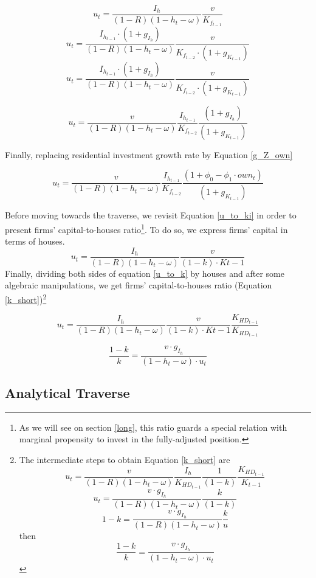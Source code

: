 \documentclass[11pt]{article}
\begin{document}
\begin{equation}
\label{u_to_k}
u_t = \frac{I_h}{(1-R)(1-h_t - \omega)}\frac{v}{K_{f_{t-1}}}
\end{equation}
$$
u_t = \frac{I_{h_{t-1}}\cdot (1 + g_{I_h})}{(1-R)(1-h_t - \omega)}\frac{v}{K_{f_{t-2}}\cdot (1+g_{K_{t-1}})}
$$
$$
u_t = \frac{I_{h_{t-1}}\cdot (1 + g_{I_h})}{(1-R)(1-h_t - \omega)}\frac{v}{K_{f_{t-2}}\cdot (1+g_{K_{t-1}})}
$$

\begin{equation}
\label{short_u}
u_t = \frac{v}{(1-R)(1-h_t - \omega)}\frac{I_{h_{t-1}}}{K_{f_{t-2}}}\frac{(1 + g_{I_h})}{(1+g_{K_{t-1}})}
\end{equation}


Finally, replacing residential investment growth rate by Equation \ref{g_Z_own}


\begin{equation}
\label{short_u}
u_t = \frac{v}{(1-R)(1-h_t - \omega)}\frac{I_{h_{t-1}}}{K_{f_{t-2}}}\frac{(1 + \phi_0 - \phi_1\cdot own_t)}{(1+g_{K_{t-1}})}
\end{equation}

Before moving towards the traverse, we revisit Equation \ref{u_to_ki} in order to present firms' capital-to-houses ratio\footnote{As we will see on section \ref{long}, this ratio guards a special relation with marginal propensity to invest in the fully-adjusted position.}.  To do so, we express firms' capital in terms of houses. 
$$
u_t = \frac{I_h}{(1-R)(1-h_t - \omega)}\frac{v}{(1-k)\cdot K{t-1}}
$$
Finally, dividing both sides of equation \ref{u_to_k} by houses and after some algebraic manipulations, we get firms' capital-to-houses ratio (Equation \ref{k_short})\footnote{The intermediate steps to obtain Equation \ref{k_short} are
$$
u_t = \frac{v}{(1-R)(1-h_t - \omega)}\frac{I_h}{K_{HD_{t-1}}}\frac{1}{(1-k)}\frac{K_{HD_{t-1}}}{K_{t-1}}
$$
$$
u_t = \frac{v\cdot g_{I_h}}{(1-R)(1-h_t - \omega)}\frac{k}{(1-k)}
$$
$$
1-k = \frac{v\cdot g_{I_h}}{(1-R)(1-h_t - \omega)}\frac{k}{u}
$$
then
$$
\frac{1-k}{k} = \frac{v\cdot g_{I_h}}{(1 - h_t - \omega)\cdot u_{t}}
$$}

$$
u_t = \frac{I_h}{(1-R)(1-h_t - \omega)}\frac{v}{(1-k)\cdot K{t-1}}\frac{K_{HD_{t-1}}}{K_{HD_{t-1}}}
$$

\begin{equation}
\label{k_short}
\frac{1-k}{k} = \frac{v\cdot g_{I_h}}{(1 - h_t - \omega)\cdot u_{t}}
\end{equation}


\subsection{Analytical Traverse}
\label{sec:org2bfd389}
\end{document}
